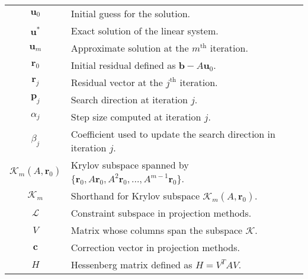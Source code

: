 \begin{longtable}{c p{10cm}}
    $\mathbf{u}_0$                   & Initial guess for the solution.                                                                             \\
    $\mathbf{u}^*$                   & Exact solution of the linear system.                                                                        \\
    $\mathbf{u}_m$                   & Approximate solution at the $m^{\text{th}}$ iteration.                                                      \\
    $\mathbf{r}_0$                   & Initial residual defined as $\mathbf{b}-A\mathbf{u}_0$.                                                     \\
    $\mathbf{r}_j$                   & Residual vector at the $j^{\text{th}}$ iteration.                                                           \\
    $\mathbf{p}_j$                   & Search direction at iteration $j$.                                                                          \\
    $\alpha_j$                       & Step size computed at iteration $j$.                                                                        \\
    $\beta_j$                        & Coefficient used to update the search direction in iteration $j$.                                           \\
    $\mathcal{K}_m(A, \mathbf{r}_0)$ & Krylov subspace spanned by $\{\mathbf{r}_0, A\mathbf{r}_0, A^2\mathbf{r}_0, \ldots, A^{m-1}\mathbf{r}_0\}$. \\
    $\mathcal{K}_m$                  & Shorthand for Krylov subspace $\mathcal{K}_m(A, \mathbf{r}_0)$.                                             \\
    $\mathcal{L}$                    & Constraint subspace in projection methods.                                                                  \\
    $V$                              & Matrix whose columns span the subspace $\mathcal{K}$.                                                       \\
    $\mathbf{c}$                     & Correction vector in projection methods.                                                                    \\
    $H$                              & Hessenberg matrix defined as $H = V^TAV$.                                                                   \\

\end{longtable}
